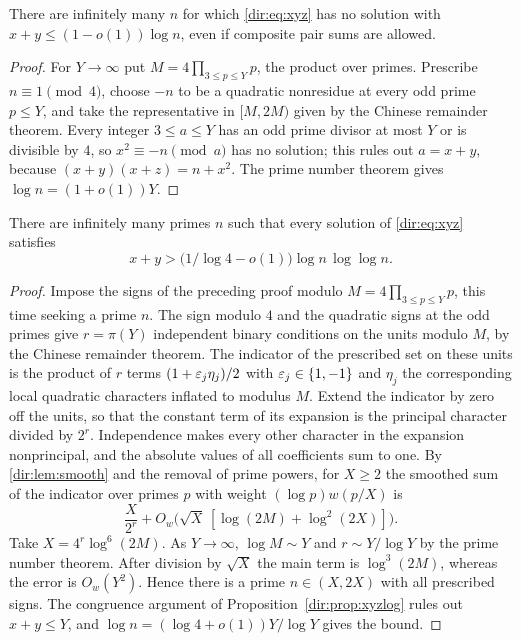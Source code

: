 \begin{proposition}\label{dir:prop:xyzlog}
There are infinitely many $n$ for which \eqref{dir:eq:xyz} has no solution with
$x+y\le(1-o(1))\log n$, even if composite pair sums are allowed.
\end{proposition}

\begin{proof}
For $Y\to\infty$ put $M=4\prod_{3\le p\le Y}p$, the product over primes. Prescribe
$n\equiv1\pmod4$, choose $-n$ to be a quadratic nonresidue at every odd prime $p\le Y$,
and take the representative in $[M,2M)$ given by the Chinese remainder theorem. Every
integer $3\le a\le Y$ has an odd prime divisor at most $Y$ or is divisible by $4$, so
$x^2\equiv-n\pmod a$ has no solution; this rules out $a=x+y$, because
$(x+y)(x+z)=n+x^2$. The prime number theorem gives $\log n=(1+o(1))Y$.
\end{proof}

\begin{proposition}\label{dir:prop:xyzprime}
There are infinitely many primes $n$ such that every solution of \eqref{dir:eq:xyz}
satisfies
\[
 x+y>\bigl(1/\log4-o(1)\bigr)\log n\,\log\log n .
\]
\end{proposition}

\begin{proof}
Impose the signs of the preceding proof modulo $M=4\prod_{3\le p\le Y}p$, this time
seeking a prime $n$. The sign modulo $4$ and the quadratic signs at the odd primes give
$r=\pi(Y)$ independent binary conditions on the units modulo $M$, by the Chinese
remainder theorem. The indicator of the prescribed set on these units is the product of
$r$ terms $(1+\varepsilon_j\eta_j)/2$ with $\varepsilon_j\in\{1,-1\}$ and $\eta_j$ the corresponding
local quadratic characters inflated to modulus $M$. Extend the indicator by zero off
the units, so that the constant term of its expansion is the principal character
divided by $2^r$. Independence makes every other character in the expansion
nonprincipal, and the absolute values of all coefficients sum to one. By
\cref{dir:lem:smooth} and the removal of prime powers, for $X\ge2$ the smoothed sum of
the indicator over primes $p$ with weight $(\log p)w(p/X)$ is
\[
 \frac X{2^r}+O_w\bigl(\sqrt X\,[\log(2M)+\log^2(2X)]\bigr).
\]
Take $X=4^r\log^6(2M)$. As $Y\to\infty$, $\log M\sim Y$ and $r\sim Y/\log Y$ by the
prime number theorem. After division by $\sqrt X$ the main term is $\log^3(2M)$,
whereas the error is $O_w(Y^2)$. Hence there is a prime $n\in(X,2X)$ with all
prescribed signs. The congruence argument of Proposition~\ref{dir:prop:xyzlog} rules out
$x+y\le Y$, and $\log n=(\log4+o(1))Y/\log Y$ gives the bound.
\end{proof}

